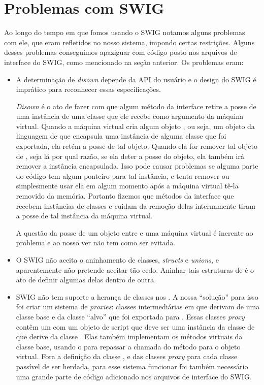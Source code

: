  
  \section{Problemas com SWIG}
  Ao longo do tempo em que fomos usando o SWIG notamos alguns problemas com ele, que eram
  refletidos no nosso sistema, impondo certas restrições. Alguns desses problemas conseguimos
  apaziguar com código posto nos arquivos de interface do SWIG, como mencionado na seção
  anterior. Os problemas eram:
  
  \begin{itemize}
    \item A determinação de \textit{disown} depende da API do usuário e o design do SWIG é
      imprático para reconhecer essas especificações.
      
      \textit{Disown} é o ato de fazer com que algum método da interface \CXX{} retire a posse
      de uma instância de uma classe \CXX{} que ele recebe como argumento da máquina virtual. 
      Quando a máquina virtual cria algum objeto \CXX{}, ou seja, um objeto da linguagem de 
      \script{} que encapsula uma instância de alguma classe \CXX{} que foi exportada, ela
      retém a posse de tal objeto. Quando ela for remover tal objeto de \script{}, seja 
      lá por qual razão, se ela deter a posse do objeto, ela também irá remover a instância 
      \CXX{} encapsulada. Isso pode causar problemas se alguma parte do código \CXX{} tem 
      algum ponteiro para tal instância, e tenta remover ou simplesmente usar ela em algum
      momento após a máquina virtual tê-la removido da memória. Portanto fizemos que métodos
      da interface \CXX{} que recebem instâncias de classes e cuidam da remoção delas 
      internamente tiram a posse de tal instância da máquina virtual.
      
      A questão da posse de um objeto entre \CXX{} e uma máquina virtual é inerente ao
      problema e ao nosso ver não tem como ser evitada.
    \item O SWIG não aceita o aninhamento de classes, \textit{structs} e \textit{unions}, e 
      aparentemente não pretende aceitar tão cedo. Aninhar tais estruturas de \CXX{} é o ato
      de definir algumas delas dentro de outra.
    \item SWIG não tem suporte a herança de classes \CXX{} nos . A nossa ``solução''
      para isso foi criar um sistema de \textit{proxies}\footnotemark: classes intermediárias em
      \CXX{} que derivam de uma classe base  e da classe ``alvo'' \CXX{} que foi
      exportada para \script{}. Essas classes \textit{proxy} contêm um \VObj{} com um objeto de
      script que deve ser uma instância da classe de \script{} que derive da classe \CXX{}. Elas
      também implementam os métodos virtuais da classe base, usando o \VObj{} para repassar a
      chamada do método para o objeto virtual. Fora a definição da classe , e
      das classes \textit{proxy} para cada classe \CXX{} passível de ser herdada, para esse
      sistema funcionar foi também necessário uma grande parte de código adicionado nos arquivos de
      interface do SWIG.
      

\end{itemize}

